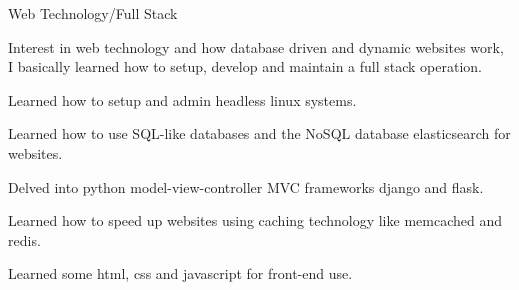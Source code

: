 \begin{cventries}
\cventry
  {} %
  {Web Technology/Full Stack} %
  {} %
  {} %
  {
    \begin{cvitems} %
      \item {Interest in web technology and how database driven and dynamic websites work, I basically learned how to setup, develop and maintain a full stack operation.}
      \item {Learned how to setup and admin headless linux systems.}
      \item {Learned how to use SQL-like databases and the NoSQL database elasticsearch for websites.}
      \item {Delved into python model-view-controller MVC frameworks django and flask.}
      \item {Learned how to speed up websites using caching technology like memcached and redis.}
      \item {Learned some html, css and javascript for front-end use.}
    \end{cvitems}
  }


\end{cventries}
